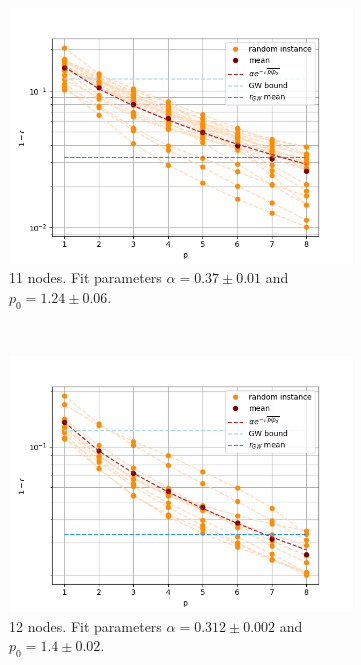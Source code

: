 \begin{figure}[H]
	\centering
	\begin{subfigure}[t]{0.45\textwidth}
		\centering
		\includegraphics[width=\textwidth]{figures/interp/fom_er075_n11}
		\caption{11 nodes. Fit parameters $\alpha = 0.37 \pm 0.01$ and $p_0 = 1.24 \pm 0.06$.}
	\end{subfigure}
	~
	\begin{subfigure}[t]{0.45\textwidth}
		\centering
		\includegraphics[width=\textwidth]{figures/interp/fom_er075_n12}
		\caption{12 nodes. Fit parameters $\alpha = 0.312 \pm 0.002$ and $p_0 = 1.4 \pm 0.02$.}
	\end{subfigure}
	\\
	\centering
	\begin{subfigure}[t]{0.45\textwidth}

\end{subfigure}
\end{figure}
